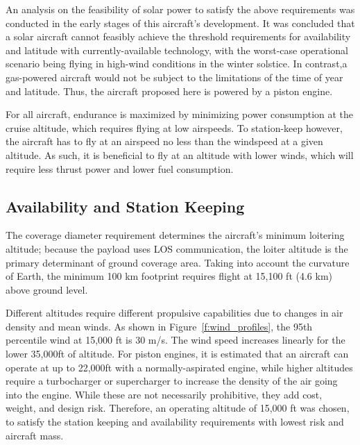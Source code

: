 \documentclass[journal]{aiaa-tc}%
\begin{document}
An analysis on the feasibility of solar power to satisfy the above requirements was conducted in the early stages of this aircraft's development. It was concluded that a solar aircraft cannot feasibly achieve the threshold requirements for availability and latitude with currently-available technology, with the worst-case operational scenario being flying in high-wind conditions in the winter solstice. In contrast,a gas-powered aircraft would not be subject to the limitations of the time of year and latitude. Thus, the aircraft proposed here is powered by a piston engine.

For all aircraft, endurance is maximized by minimizing power consumption at the cruise altitude, which requires flying at low airspeeds. To station-keep however, the aircraft has to fly at an airspeed no less than the windspeed at a given altitude. As such, it is beneficial to fly at an altitude with lower winds, which will require less thrust power and lower fuel consumption.

\subsection{Availability and Station Keeping}

   The coverage diameter requirement determines the aircraft's minimum loitering altitude; because the payload uses LOS communication, the loiter altitude is the primary determinant of ground coverage area. Taking into account the curvature of Earth, the minimum 100 km footprint requires flight at 15,100 ft (4.6 km) above ground level. 

    Different altitudes require different propulsive capabilities due to changes in air density and mean winds. As shown in Figure~\ref{f:wind_profiles}, the 95th percentile wind at 15,000 ft is 30 m/s. The wind speed increases linearly for the lower 35,000ft of altitude. For piston engines, it is estimated that an aircraft can operate at up to 22,000ft with a normally-aspirated engine, while higher altitudes require a turbocharger or supercharger to increase the density of the air going into the engine. While these are not necessarily prohibitive, they add cost, weight, and design risk. Therefore, an operating altitude of 15,000 ft was chosen, to satisfy the station keeping and availability requirements with lowest risk and aircraft mass. 
    
\end{document}
